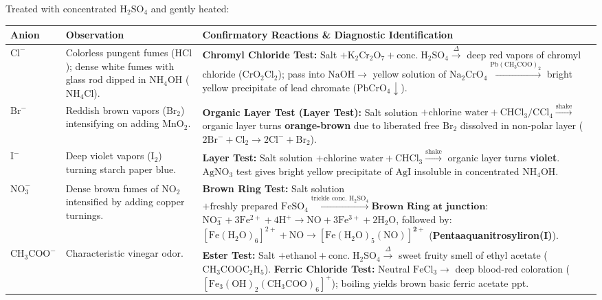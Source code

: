 \documentclass[10pt,a4paper]{article}
\begin{document}
\begin{conceptbox}
Treated with concentrated $\mathrm{H_2SO_4}$ and gently heated:
\begin{center}
\scriptsize
\begin{tabular}{|p{1.2cm}|p{3.8cm}|p{9.0cm}|}
\hline
\textbf{Anion} & \textbf{Observation} & \textbf{Confirmatory Reactions \& Diagnostic Identification} \\
\hline
$\mathrm{Cl^-}$ & Colorless pungent fumes ($\mathrm{HCl}$); dense white fumes with glass rod dipped in $\mathrm{NH_4OH}$ ($\mathrm{NH_4Cl}$). & \textbf{Chromyl Chloride Test:} Salt $+ \mathrm{K_2Cr_2O_7} + \mathrm{conc.\; H_2SO_4} \xrightarrow{\Delta}$ deep red vapors of chromyl chloride ($\mathrm{CrO_2Cl_2}$); pass into $\mathrm{NaOH} \to$ yellow solution of $\mathrm{Na_2CrO_4} \xrightarrow{\mathrm{Pb(CH_3COO)_2}}$ bright yellow precipitate of lead chromate ($\mathrm{PbCrO_4} \downarrow$). \\
\hline
$\mathrm{Br^-}$ & Reddish brown vapors ($\mathrm{Br_2}$) intensifying on adding $\mathrm{MnO_2}$. & \textbf{Organic Layer Test (Layer Test):} Salt solution $+ \text{chlorine water} + \mathrm{CHCl_3 / CCl_4} \xrightarrow{\text{shake}}$ organic layer turns \textbf{orange-brown} due to liberated free $\mathrm{Br_2}$ dissolved in non-polar layer ($2\mathrm{Br^-} + \mathrm{Cl_2} \to 2\mathrm{Cl^-} + \mathrm{Br_2}$). \\
\hline
$\mathrm{I^-}$ & Deep violet vapors ($\mathrm{I_2}$) turning starch paper blue. & \textbf{Layer Test:} Salt solution $+ \text{chlorine water} + \mathrm{CHCl_3} \xrightarrow{\text{shake}}$ organic layer turns \textbf{violet}. $\mathrm{AgNO_3}$ test gives bright yellow precipitate of $\mathrm{AgI}$ insoluble in concentrated $\mathrm{NH_4OH}$. \\
\hline
$\mathrm{NO_3^-}$ & Dense brown fumes of $\mathrm{NO_2}$ intensified by adding copper turnings. & \textbf{Brown Ring Test:} Salt solution $+ \text{freshly prepared } \mathrm{FeSO_4} \xrightarrow{\text{trickle conc. } \mathrm{H_2SO_4}} \mathbf{\text{Brown Ring at junction}}$: \newline $\mathrm{NO_3^-} + 3\mathrm{Fe^{2+}} + 4\mathrm{H}^+ \to \mathrm{NO} + 3\mathrm{Fe^{3+}} + 2\mathrm{H_2O}$, followed by: \newline $[\mathrm{Fe(H_2O)_6}]^{2+} + \mathrm{NO} \to \mathbf{[\mathrm{Fe(H_2O)_5(NO)}]^{2+}}$ (\textbf{Pentaaquanitrosyliron(I)}). \\
\hline
$\mathrm{CH_3COO^-}$ & Characteristic vinegar odor. & \textbf{Ester Test:} Salt $+ \text{ethanol} + \mathrm{conc.\; H_2SO_4} \xrightarrow{\Delta}$ sweet fruity smell of ethyl acetate ($\mathrm{CH_3COOC_2H_5}$). \textbf{Ferric Chloride Test:} Neutral $\mathrm{FeCl}_3 \to$ deep blood-red coloration ($\mathrm{[Fe_3(OH)_2(CH_3COO)_6]^+}$); boiling yields brown basic ferric acetate ppt. \\
\hline
\end{tabular}
\end{center}
\end{conceptbox}
\end{document}
